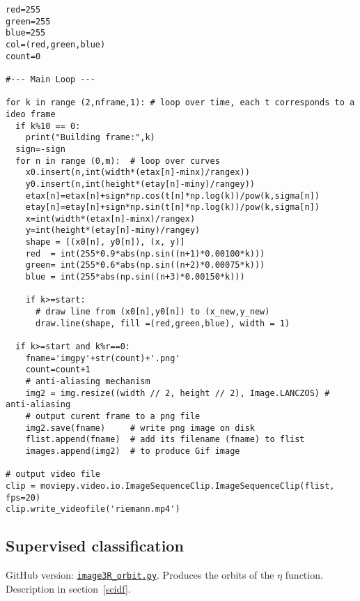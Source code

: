 \documentclass[oneside,10pt]{book}
\begin{document}
\begin{lstlisting}
red=255
green=255
blue=255
col=(red,green,blue)
count=0

#--- Main Loop ---

for k in range (2,nframe,1): # loop over time, each t corresponds to a ideo frame
  if k%10 == 0:
    print("Building frame:",k)
  sign=-sign
  for n in range (0,m):  # loop over curves
    x0.insert(n,int(width*(etax[n]-minx)/rangex))
    y0.insert(n,int(height*(etay[n]-miny)/rangey))
    etax[n]=etax[n]+sign*np.cos(t[n]*np.log(k))/pow(k,sigma[n])
    etay[n]=etay[n]+sign*np.sin(t[n]*np.log(k))/pow(k,sigma[n])
    x=int(width*(etax[n]-minx)/rangex)
    y=int(height*(etay[n]-miny)/rangey)
    shape = [(x0[n], y0[n]), (x, y)]
    red  = int(255*0.9*abs(np.sin((n+1)*0.00100*k)))
    green= int(255*0.6*abs(np.sin((n+2)*0.00075*k)))
    blue = int(255*abs(np.sin((n+3)*0.00150*k)))

    if k>=start:
      # draw line from (x0[n],y0[n]) to (x_new,y_new)
      draw.line(shape, fill =(red,green,blue), width = 1)

  if k>=start and k%r==0:
    fname='imgpy'+str(count)+'.png'
    count=count+1
    # anti-aliasing mechanism
    img2 = img.resize((width // 2, height // 2), Image.LANCZOS) # anti-aliasing
    # output curent frame to a png file
    img2.save(fname)     # write png image on disk
    flist.append(fname)  # add its filename (fname) to flist
    images.append(img2)  # to produce Gif image

# output video file
clip = moviepy.video.io.ImageSequenceClip.ImageSequenceClip(flist, fps=20) 
clip.write_videofile('riemann.mp4')
\end{lstlisting}

\subsection{Supervised classification}\label{class222}

GitHub version: \href{https://github.com/VincentGranville/Visualizations/blob/main/Source-Code/image3R_orbit.py}{\texttt{image3R\_orbit.py}}. Produces the orbits of the $\eta$ function. Description in section~\ref{scidf}.  
\end{document}
